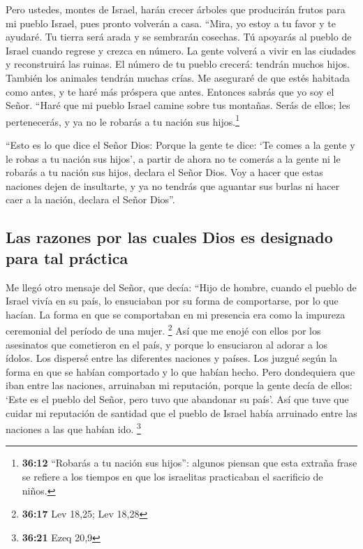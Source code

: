  Pero ustedes, montes de Israel, harán crecer árboles que
producirán frutos para mi pueblo Israel, pues pronto volverán a casa.
 ``Mira, yo estoy a tu favor y te ayudaré. Tu tierra será
arada y se sembrarán cosechas.  Tú apoyarás al pueblo de
Israel cuando regrese y crezca en número. La gente volverá a vivir en
las ciudades y reconstruirá las ruinas.  El número de tu
pueblo crecerá: tendrán muchos hijos. También los animales tendrán
muchas crías. Me aseguraré de que estés habitada como antes, y te haré
más próspera que antes. Entonces sabrás que yo soy el Señor.
 ``Haré que mi pueblo Israel camine sobre tus montañas.
Serás de ellos; les pertenecerás, y ya no le robarás a tu nación sus
hijos.\footnote{\textbf{36:12} ``Robarás a tu nación sus hijos'':
  algunos piensan que esta extraña frase se refiere a los tiempos en que
  los israelitas practicaban el sacrificio de niños.}

 ``Esto es lo que dice el Señor Dios: Porque la gente te
dice: `Te comes a la gente y le robas a tu nación sus hijos',
 a partir de ahora no te comerás a la gente ni le robarás
a tu nación sus hijos, declara el Señor Dios.  Voy a
hacer que estas naciones dejen de insultarte, y ya no tendrás que
aguantar sus burlas ni hacer caer a la nación, declara el Señor Dios''.

\hypertarget{las-razones-por-las-cuales-dios-es-designado-para-tal-pruxe1ctica}{%
\subsection{Las razones por las cuales Dios es designado para tal
práctica}\label{las-razones-por-las-cuales-dios-es-designado-para-tal-pruxe1ctica}}

 Me llegó otro mensaje del Señor, que decía:
 ``Hijo de hombre, cuando el pueblo de Israel vivía en su
país, lo ensuciaban por su forma de comportarse, por lo que hacían. La
forma en que se comportaban en mi presencia era como la impureza
ceremonial del período de una mujer. \footnote{\textbf{36:17} Lev 18,25;
  Lev 18,28}  Así que me enojé con ellos por los
asesinatos que cometieron en el país, y porque lo ensuciaron al adorar a
los ídolos.  Los dispersé entre las diferentes naciones y
países. Los juzgué según la forma en que se habían comportado y lo que
habían hecho.  Pero dondequiera que iban entre las
naciones, arruinaban mi reputación, porque la gente decía de ellos:
`Este es el pueblo del Señor, pero tuvo que abandonar su país'.
 Así que tuve que cuidar mi reputación de santidad que el
pueblo de Israel había arruinado entre las naciones a las que habían
ido. \footnote{\textbf{36:21} Ezeq 20,9}

